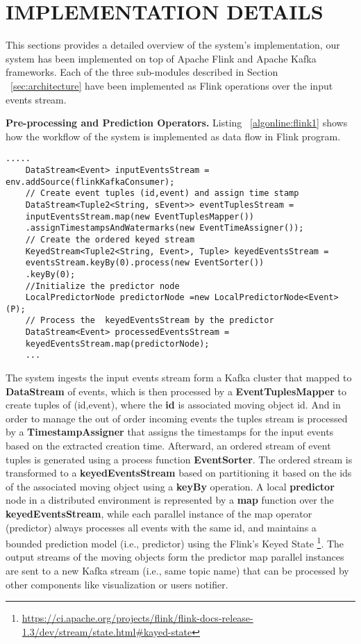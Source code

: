 

\section{IMPLEMENTATION DETAILS}
\label{sec:impl}
This sections provides a detailed overview of the system's implementation, our system has been implemented on top of Apache Flink and Apache Kafka frameworks. Each of the three sub-modules described in Section  ~\ref{sec:architecture} have been implemented as Flink operations over the input events stream. 

\textbf{Pre-processing and Prediction Operators.} Listing ~\ref{algonline:flink1} shows how the workflow of the system is implemented as data flow in Flink program.


	\begin{lstlisting}[caption={Flink pipeline for local predictors workflow},label={algonline:flink1},frame=single]
	.....
	DataStream<Event> inputEventsStream = env.addSource(flinkKafkaConsumer);	
	// Create event tuples (id,event) and assign time stamp 
	DataStream<Tuple2<String, sEvent>> eventTuplesStream =
	inputEventsStream.map(new EventTuplesMapper())
	.assignTimestampsAndWatermarks(new EventTimeAssigner());	
	// Create the ordered keyed stream 
	KeyedStream<Tuple2<String, Event>, Tuple> keyedEventsStream =
	eventsStream.keyBy(0).process(new EventSorter())
	.keyBy(0);	
	//Initialize the predictor node 
	LocalPredictorNode predictorNode =new LocalPredictorNode<Event>(P);
	// Process the  keyedEventsStream by the predictor 
	DataStream<Event> processedEventsStream =
	keyedEventsStream.map(predictorNode);
	...
	\end{lstlisting}
	
The system ingests the input events stream form a Kafka cluster that mapped to \textbf{DataStream} of events, which is then processed by a \textbf{EventTuplesMapper} to create tuples of (id,event), where the  \textbf{id} is associated moving object id. And in order to manage the out of order incoming events the tuples stream is processed by a \textbf{TimestampAssigner} that assigns the timestamps for the input events  based on the extracted creation time. Afterward,  an ordered stream of event tuples is generated using a process function \textbf{EventSorter}. The ordered stream is transformed to a \textbf{keyedEventsStream} based on partitioning it based on the ids of the associated moving object using a \textbf{keyBy} operation. A local \textbf{predictor} node in a distributed environment is represented by a \textbf{map} function over the \textbf{keyedEventsStream}, while each parallel instance of the map operator (predictor) always processes all events with the same id, and maintains a bounded prediction model (i.e., \pmcmr predictor) using the Flink's Keyed State \footnote{\url{https://ci.apache.org/projects/flink/flink-docs-release-1.3/dev/stream/state.html\#kayed-state}}.   The output streams of the moving objects form the predictor map parallel instances are sent to a new Kafka stream (i.e., same topic name) that can be processed by other components like visualization or users notifier.


